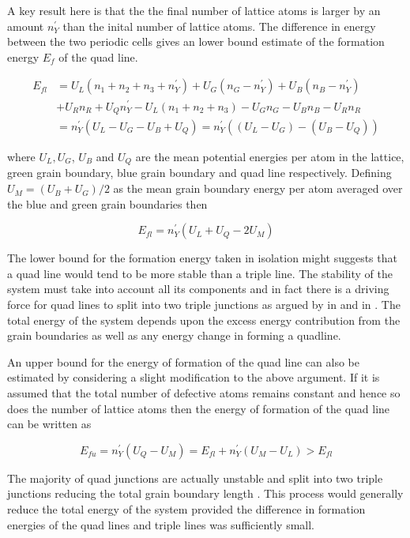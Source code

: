\documentclass[12pt,a4paper]{book}
\begin{document}
A key result here is that the the final number of lattice atoms is larger by an amount $n_Y^{\prime}$ than the inital number of lattice atoms. The difference in energy between the two periodic cells gives an lower bound estimate of the formation energy $E_f$ of the quad line.

\begin{align*}
 E_{fl} &= U_L(n_1+n_2+n_3+n_Y^{\prime}) + U_G(n_G - n_Y^{\prime})
+ U_B(n_B - n_Y^{\prime}) \\ 
&+ U_R n_R + U_Q n_Y^{\prime}
- U_L(n_1+n_2+n_3) - U_G n_G - U_B n_B - U_R n_R  
\\ 
&=  n_Y^{\prime}(U_L - U_G - U_B + U_Q) = n_Y^{\prime}((U_L - U_G) - (U_B - U_Q)) 
\end{align*}

where $U_L, U_G$, $U_B$ and $U_Q$ are the mean potential energies per atom in the lattice, green grain boundary, blue grain boundary
and quad line respectively. Defining $U_M = (U_B + U_G)/2$ as the mean grain boundary energy per atom averaged over the blue and green grain boundaries then

\[E_{fl} =  n_Y^{\prime}(U_L + U_Q - 2U_M)\]

The lower bound for the formation energy taken in isolation might suggests that a quad line would tend to be more stable than a triple line. The stability of the system must take into account all its components and in fact there is a driving force for quad lines to split into two triple junctions as argued by \citeauthor{Lazar2011} in \cite{Lazar2011} and \citeauthor{Kinderlehrer2006} in \cite{Kinderlehrer2006}. The total energy of the system depends upon the excess energy contribution from the grain boundaries as well as any energy change in forming a quadline.


An upper bound for the energy of formation of the quad line can also be estimated by considering a slight modification to the above argument. If it is assumed that the total number of defective atoms remains constant and hence so does the number of lattice atoms then the energy of formation of the quad line can
be written as

\[E_{fu} =  n_Y^{\prime}(U_Q - U_M) = E_{fl} + n_Y^{\prime}(U_M - U_L) > E_{fl} \]

The majority of quad junctions are actually unstable and split into two triple junctions reducing the total grain boundary length \cite{Lazar2011,Kinderlehrer2006}. This process would generally reduce the total energy of the system provided the difference in formation energies of the quad lines and triple lines was sufficiently small. 
\end{document}
